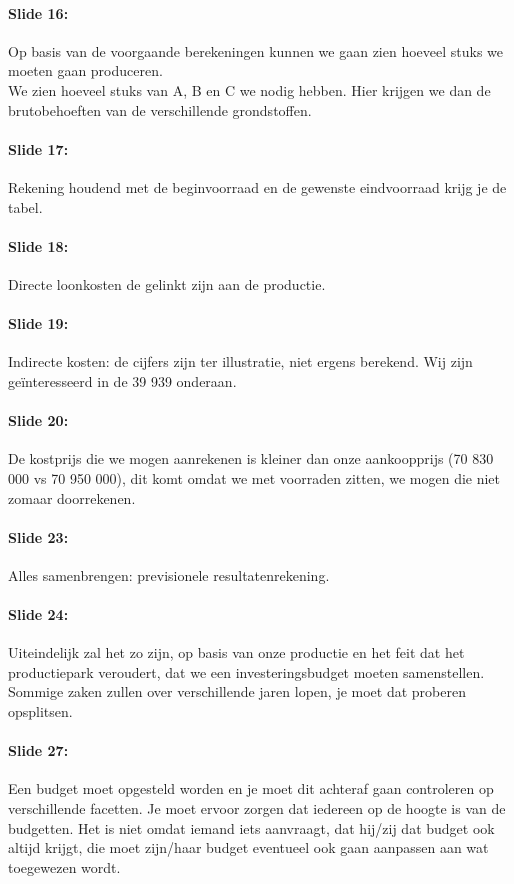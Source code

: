 \documentclass[10pt,a4paper]{report}
\begin{document}
\paragraph{Slide 16:} Op basis van de voorgaande berekeningen kunnen we gaan zien hoeveel stuks we moeten gaan produceren.\\
We zien hoeveel stuks van A, B en C we nodig hebben. Hier krijgen we dan de brutobehoeften van de verschillende grondstoffen. 

\paragraph{Slide 17:} Rekening houdend met de beginvoorraad en de gewenste eindvoorraad krijg je de tabel. 

\paragraph{Slide 18:} Directe loonkosten de gelinkt zijn aan de productie. 

\paragraph{Slide 19:} Indirecte kosten: de cijfers zijn ter illustratie, niet ergens berekend. Wij zijn ge\"interesseerd in de 39 939 onderaan.

\paragraph{Slide 20:} De kostprijs die we mogen aanrekenen is kleiner dan onze aankoopprijs (70 830 000 vs 70 950 000), dit komt omdat we met voorraden zitten, we mogen die niet zomaar doorrekenen.

\paragraph{Slide 23:} Alles samenbrengen: previsionele resultatenrekening. 

\paragraph{Slide 24:} Uiteindelijk zal het zo zijn, op basis van onze productie en het feit dat het productiepark veroudert, dat we een investeringsbudget moeten samenstellen. Sommige zaken zullen over verschillende jaren lopen, je moet dat proberen opsplitsen. 

\paragraph{Slide 27:} Een budget moet opgesteld worden en je moet dit achteraf gaan controleren op verschillende facetten. Je moet ervoor zorgen dat iedereen op de hoogte is van de budgetten. Het is niet omdat iemand iets aanvraagt, dat hij/zij dat budget ook altijd krijgt, die moet zijn/haar budget eventueel ook gaan aanpassen aan wat toegewezen wordt. 
\end{document}
